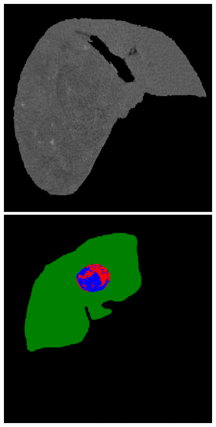 \begin{figure}[!ht]
\begin{minipage}{4cm}
\end{minipage} \hspace{-0.3cm}
\begin{minipage}{4cm}
\includegraphics[width=\linewidth]{../SemanticSeg/images/5_8_orig_resized}
\end{minipage}
\vspace{-0.2cm}
\begin{minipage}{4cm}
\includegraphics[width=\linewidth]{../SemanticSeg/images/1_21_gt_resized}

\end{minipage}
\end{figure}
